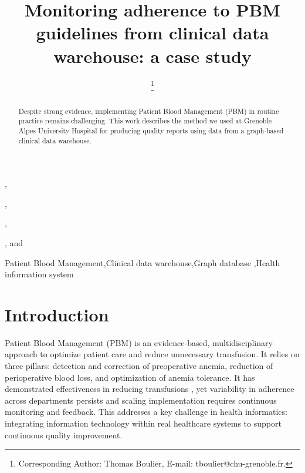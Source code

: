 \documentclass{IOS-Book-Article}
\def\hb{\hbox to 11.5 cm{}}
\begin{document}
\pagestyle{headings}
\def\thepage{}
\begin{frontmatter}

\title{Monitoring adherence to PBM guidelines from clinical data warehouse: a case study}

\markboth{}{October 2025\hb}

\author[A]{ },
\author[A]{ },
\author[A]{ },
\author[A]{ %
\thanks{Corresponding Author: Thomas Boulier, E-mail: tboulier@chu-grenoble.fr.}}, 
and
\author[A]{ }

\address[A]{Univ. Grenoble Alpes, CNRS, UMR 5525, VetAgro Sup, Grenoble INP, CHU Grenoble Alpes, TIMC, 38000 Grenoble, France}

\begin{abstract}
Despite strong evidence, implementing Patient Blood Management (PBM) in routine practice remains 
challenging. This work describes the method we used at Grenoble Alpes University Hospital for 
producing quality reports using data from a graph-based clinical data warehouse.
\end{abstract}

\begin{keyword}
Patient Blood Management\sep Clinical data warehouse\sep Graph database \sep Health information system
\end{keyword}
\end{frontmatter}

\markboth{October 2025\hb}{October 2025\hb}

\section{Introduction}

Patient Blood Management (PBM) is an evidence-based, multidisciplinary approach to
optimize patient care and reduce unnecessary transfusion. 
It relies on three pillars: detection and correction of preoperative anemia, reduction 
of perioperative blood loss, and optimization of anemia tolerance. 
It has demonstrated effectiveness in reducing 
transfusions \cite{godonReductionRedBlood2024}, yet variability in adherence across 
departments persists and scaling implementation requires continuous monitoring and feedback.
This addresses a key challenge in health informatics: integrating information 
technology within real healthcare systems to support continuous quality improvement.
\end{document}
